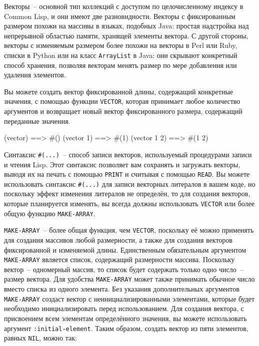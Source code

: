 Векторы~-- основной тип коллекций с доступом по целочисленному индексу в Common Lisp, и они
имеют две разновидности.  Векторы с фиксированным размером похожи на массивы в языках,
подобных Java: простая надстройка над непрерывной областью памяти, хранящей элементы
вектора. С другой стороны,
векторы с изменяемым размером более похожи на векторы в Perl или Ruby, списки в Python
или на класс \lstinline{ArrayList} в Java: они скрывают конкретный способ хранения, позволяя
векторам менять размер по мере добавления или удаления элементов.

Вы можете создать вектор фиксированной длины, содержащий конкретные значения, с помощью
функции \lstinline{VECTOR}, которая принимает любое количество аргументов и возвращает
новый вектор фиксированного размера, содержащий переданные значения.

\begin{myverb}
(vector)     ==> #()
(vector 1)   ==> #(1)
(vector 1 2) ==> #(1 2)
\end{myverb}

Синтаксис \lstinline!#(...)!~-- способ записи векторов, используемый процедурами
записи и чтения Lisp.  Этот синтаксис позволяет вам сохранять и загружать векторы,
выводя их на печать с помощью \lstinline{PRINT} и считывая с помощью \lstinline{READ}.
Вы можете использовать синтаксис \lstinline!#(...)! для
записи векторных литералов в вашем коде, но поскольку эффект изменения литералов не определён,
то для создания векторов, которые планируется изменять, вы всегда должны 
использовать \lstinline{VECTOR} или более общую функцию \lstinline{MAKE-ARRAY}.

\lstinline{MAKE-ARRAY}~-- более общая функция, чем \lstinline{VECTOR}, поскольку её можно
применять для создания массивов любой размерности, а также для создания векторов
фиксированной и изменяемой длины. Единственным обязательным аргументом
\lstinline{MAKE-ARRAY} является список, содержащий размерности массива.  Поскольку
вектор~-- одномерный массив, то список будет содержать только одно число~-- размер
вектора.  Для удобства \lstinline{MAKE-ARRAY} может также принимать обычное число вместо
списка из одного элемента.  Без указания дополнительных аргументов \lstinline{MAKE-ARRAY}
создаст вектор с неинициализированными элементами, которые будет необходимо
инициализировать перед использованием.  Для создания
вектора, с присвоением всем элементам определённого значения, вы можете использовать
аргумент \lstinline{:initial-element}.  Таким образом, создать вектор из пяти элементов,
равных \lstinline{NIL}, можно так:

